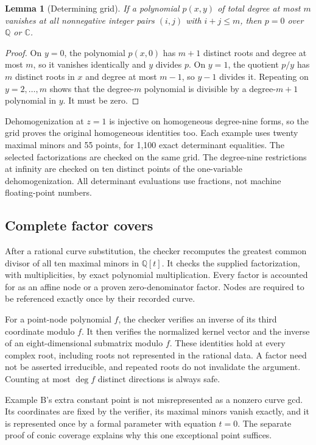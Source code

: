 \documentclass[11pt]{article}
\newtheorem{lemma}[theorem]{Lemma}
\theoremstyle{definition}\newtheorem{definition}[theorem]{Definition}
\newcommand{\C}{\mathbb C}\newcommand{\Q}{\mathbb Q}
\begin{document}
\begin{lemma}[Determining grid]\label{lem:grid}
If a polynomial $p(x,y)$ of total degree at most $m$ vanishes at all nonnegative integer pairs $(i,j)$ with $i+j\le m$, then $p=0$ over $\Q$ or $\C$.
\end{lemma}
\begin{proof}
On $y=0$, the polynomial $p(x,0)$ has $m+1$ distinct roots and degree at most $m$, so it vanishes identically and $y$ divides $p$. On $y=1$, the quotient $p/y$ has $m$ distinct roots in $x$ and degree at most $m-1$, so $y-1$ divides it. Repeating on $y=2,\ldots,m$ shows that the degree-$m$ polynomial is divisible by a degree-$m+1$ polynomial in $y$. It must be zero.
\end{proof}

Dehomogenization at $z=1$ is injective on homogeneous degree-nine forms, so the grid proves the original homogeneous identities too. Each example uses twenty maximal minors and 55 points, for 1,100 exact determinant equalities. The selected factorizations are checked on the same grid. The degree-nine restrictions at infinity are checked on ten distinct points of the one-variable dehomogenization. All determinant evaluations use fractions, not machine floating-point numbers.

\subsection{Complete factor covers}
After a rational curve substitution, the checker recomputes the greatest common divisor of all ten maximal minors in $\Q[t]$. It checks the supplied factorization, with multiplicities, by exact polynomial multiplication. Every factor is accounted for as an affine node or a proven zero-denominator factor. Nodes are required to be referenced exactly once by their recorded curve.

For a point-node polynomial $f$, the checker verifies an inverse of its third coordinate modulo $f$. It then verifies the normalized kernel vector and the inverse of an eight-dimensional submatrix modulo $f$. These identities hold at every complex root, including roots not represented in the rational data. A factor need not be asserted irreducible, and repeated roots do not invalidate the argument. Counting at most $\deg f$ distinct directions is always safe.

Example B's extra constant point is not misrepresented as a nonzero curve gcd. Its coordinates are fixed by the verifier, its maximal minors vanish exactly, and it is represented once by a formal parameter with equation $t=0$. The separate proof of conic coverage explains why this one exceptional point suffices.
\end{document}
